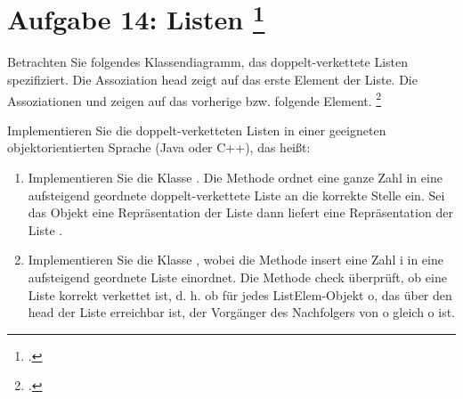 \documentclass{lehramt-informatik-aufgabe}
\begin{document}

\section{Aufgabe 14: Listen
\footcite[entnommen aus Algorithmen und
Datenstrukturen, Präsenzübung 4, Universität Bayreuth]{aud:pu:7}}

Betrachten Sie folgendes Klassendiagramm, das
doppelt-verkettete Listen spezifiziert. Die Assoziation head zeigt auf
das erste Element der Liste. Die Assoziationen  und
 zeigen auf das vorherige bzw. folgende Element.
\footcite[Thema 1 Aufgabe 1]{examen:66112:2005:03}

\begin{center}
\end{center}

\noindent
Implementieren Sie die doppelt-verketteten Listen in einer geeigneten
objektorientierten Sprache (\zB Java oder C++), das heißt:

\begin{enumerate}


\item Implementieren Sie die Klasse . Die Methode
 ordnet eine ganze Zahl  in eine aufsteigend
geordnete doppelt-verkettete Liste  an die korrekte Stelle ein.
Sei \zB das Objekt  eine Repräsentation der Liste \liJavaCode{[0,
2, 2, 6, 8]} dann liefert  eine Repräsentation der
Liste \liJavaCode{[0, 2, 2, 3, 6, 8]}.

\begin{liAntwort}
\end{liAntwort}


\item Implementieren Sie die Klasse , wobei die Methode
insert eine Zahl i in eine aufsteigend geordnete Liste einordnet. Die
Methode check überprüft, ob eine Liste korrekt verkettet ist, d. h. ob
für jedes ListElem-Objekt o, das über den head der Liste erreichbar ist,
der Vorgänger des Nachfolgers von o gleich o ist.
\end{enumerate}

\begin{liAntwort}
\end{liAntwort}
\end{document}
